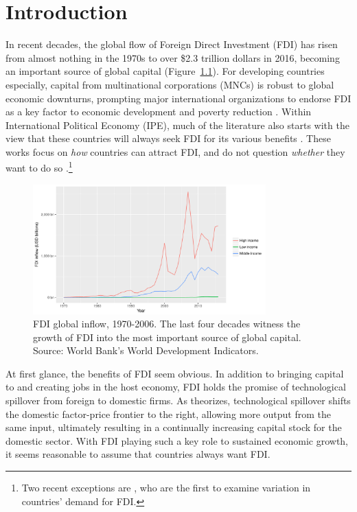 \chapter{Introduction}

In recent decades, the global flow of Foreign Direct Investment (FDI) has risen
from almost nothing in the 1970s to over \$2.3 trillion dollars in 2016,
becoming an important source of global capital (Figure~\ref{fig:globalfdi}). For
developing countries especially, capital from multinational corporations (MNCs)
is robust to global economic downturns, prompting major international
organizations to endorse FDI as a key factor to economic development and poverty
reduction \citep{Mallampally1999, WorldEconomicForum2013}. Within International
Political Economy (IPE), much of the literature also starts with the view that
these countries will always seek FDI for its various benefits
\citep{Jensen2008b}. These works focus on \textit{how} countries can attract
FDI, and do not question \textit{whether} they want to do so \citep{Jensen2003,
  Li2003, Li2006, Ahlquist2006}.\footnote{Two recent exceptions are
  \citet{Pinto2013, Pandya2016}, who are the first to examine variation in
  countries' demand for FDI.}

\begin{figure}[tbp]
  \centering
  \includegraphics[width=0.8\textwidth,keepaspectratio]{../figure/global_fdi}
  \caption[FDI global inflow, 1970-2006.]{FDI global inflow, 1970-2006. The last
    four decades witness the growth of FDI into the most important source of
    global capital. Source: World Bank's World Development Indicators.}
  \label{fig:globalfdi}
\end{figure}

At first glance, the benefits of FDI seem obvious. In addition to bringing
capital to and creating jobs in the host economy, FDI holds the promise of
technological spillover from foreign to domestic firms. As \citet{Findlay1978}
theorizes, technological spillover shifts the domestic factor-price frontier to
the right, allowing more output from the same input, ultimately resulting in a
continually increasing capital stock for the domestic sector. With FDI playing
such a key role to sustained economic growth, it seems reasonable to assume that
countries always want FDI.


